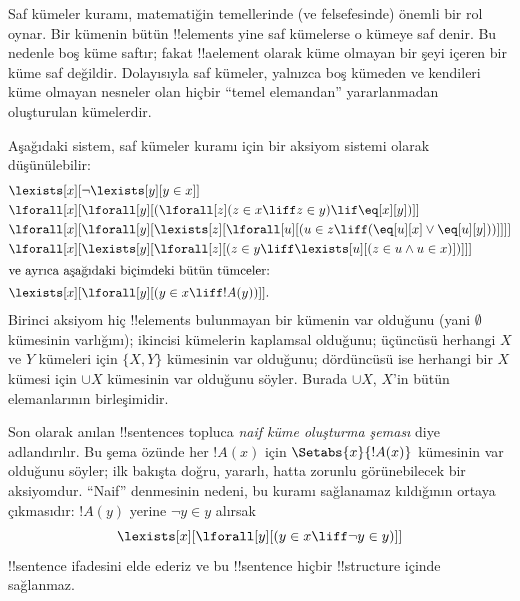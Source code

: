 \begin{ex}
Saf kümeler kuramı, matematiğin temellerinde (ve felsefesinde) önemli
bir rol oynar. Bir kümenin bütün !!{element}s yine saf kümelerse o
kümeye saf denir. Bu nedenle boş küme saftır; fakat !!a{element}
olarak küme olmayan bir şeyi içeren bir küme saf değildir. Dolayısıyla
saf kümeler, yalnızca boş kümeden ve kendileri küme olmayan nesneler
olan hiçbir ``temel elemandan'' yararlanmadan oluşturulan kümelerdir.

Aşağıdaki sistem, saf kümeler kuramı için bir aksiyom sistemi olarak
düşünülebilir:
\begin{align*}
& \lexists[x][\lnot \lexists[y][y \in x]]\\
& \lforall[x][\lforall[y][(\lforall[z](z \in x \liff z \in y) \lif
\eq[x][y])]]\\
& \lforall[x][\lforall[y][\lexists[z][\lforall[u][(u \in z \liff
(\eq[u][x] \lor \eq[u][y]))]]]]\\
& \lforall[x][\lexists[y][\lforall[z][(z \in y \liff \lexists[u][(z \in
        u \land u \in x)])]]]\\
\intertext{ve ayrıca aşağıdaki biçimdeki bütün tümceler:} &
\lexists[x][\lforall[y][(y \in x \liff !A(y))]].
\end{align*}
Birinci aksiyom hiç !!{element}s bulunmayan bir kümenin var olduğunu
(yani $\emptyset$ kümesinin varlığını); ikincisi kümelerin kaplamsal
olduğunu; üçüncüsü herhangi $X$ ve $Y$ kümeleri için $\{X,Y\}$
kümesinin var olduğunu; dördüncüsü ise herhangi bir $X$ kümesi için
$\cup X$ kümesinin var olduğunu söyler. Burada $\cup X$, $X$'in bütün
elemanlarının birleşimidir.

Son olarak anılan !!{sentence}s topluca \emph{naif küme oluşturma
şeması} diye adlandırılır. Bu şema özünde her $!A(x)$ için
$\Setabs{x}{!A(x)}$ kümesinin var olduğunu söyler; ilk bakışta doğru,
yararlı, hatta zorunlu görünebilecek bir aksiyomdur. ``Naif'' denmesinin
nedeni, bu kuramı sağlanamaz kıldığının ortaya çıkmasıdır: $!A(y)$
yerine $\lnot y\in y$ alırsak
\[
\lexists[x][\lforall[y][(y \in x \liff \lnot y \in y)]]
\]
!!{sentence} ifadesini elde ederiz ve bu !!{sentence} hiçbir
!!{structure} içinde sağlanmaz.
\end{ex}

